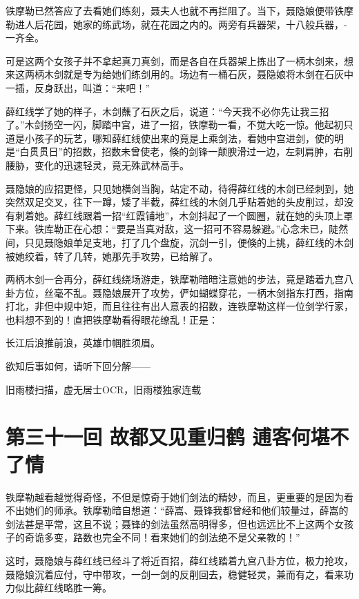 \documentclass[12pt,oneside]{book}
\begin{document}
铁摩勒已然答应了去看她们练刻，聂夫人也就不再拦阻了。当下，聂隐娘便带铁摩勒进人后花园，她家的练武场，就在花园之内的。两旁有兵器架，十八般兵器，-一齐全。

可是这两个女孩子并不拿起真刀真剑，而是各自在兵器架上拣出了一柄木剑来，想来这两柄木剑就是专为给她们练剑用的。场边有一桶石灰，聂隐娘将木剑在石灰中一插，反身跃出，叫道：``来吧！''

薛红线学了她的样子，木剑蘸了石灰之后，说道：``今天我不必你先让我三招了。''木剑扬空一闪，脚踏中宫，进了一招，铁摩勒一看，不觉大吃一惊。他起初只道是小孩子的玩艺，哪知薛红线使出来的竟是上乘剑法，看她中宫进剑，使的明是``白贯贯日''的招数，招数未曾使老，倏的剑锋一颠腴滑过一边，左刺肩肿，右削腰胁，变化的迅速轻灵，竟无殊武林高手。

聂隐娘的应招更怪，只见她横剑当胸，站定不动，待得薛红线的木剑已经刺到，她突然双足交叉，往下一蹲，矮了半截，薛红线的木剑几乎贴着她的头皮削过，却没有刺着她。薛红线跟着一招``红霞铺地''，木剑抖起了一个圆圈，就在她的头顶上罩下来。铁库勒正在心想：``要是当真对敌，这一招可不容易躲避。''心念未已，陡然间，只见聂隐娘单足支地，打了几个盘旋，沉剑一引，便倏的上挑，薛红线的木剑被她绞着，转了几转，她那先手攻势，已给解了。

两柄木剑一合再分，薛红线绕场游走，铁摩勒暗暗注意她的步法，竟是踏着九宫八卦方位，丝毫不乱。聂隐娘展开了攻势，俨如蝴蝶穿花，一柄木剑指东打西，指南打北，非但中规中矩，而且往往有出人意表的招数，连铁摩勒这样一位剑学行家，也料想不到的！直把铁摩勒看得眼花缭乱！正是：

长江后浪推前浪，英雄巾帼胜须眉。

欲知后事如何，请听下回分解------

旧雨楼扫描，虚无居士OCR，旧雨楼独家连载

\chapter{第三十一回 故都又见重归鹤
逋客何堪不了情}\label{ux7b2cux4e09ux5341ux4e00ux56de-ux6545ux90fdux53c8ux89c1ux91cdux5f52ux9e64-ux900bux5ba2ux4f55ux582aux4e0dux4e86ux60c5}

铁摩勒越看越觉得奇怪，不但是惊奇于她们剑法的精妙，而且，更重要的是因为看不出她们的师承。铁摩勒暗自想道：``薛嵩、聂锋我都曾经和他们较量过，薛嵩的剑法甚是平常，这且不说；聂锋的剑法虽然高明得多，但也远远比不上这两个女孩子的奇诡多变，路数也完全不同！看来她们的剑法绝不是父亲教的！''

这时，聂隐娘与薛红线已经斗了将近百招，薛红线踏着九宫八卦方位，极力抢攻，聂隐娘沉着应付，守中带攻，一剑一剑的反削回去，稳健轻灵，兼而有之，看来功力似比薛红线略胜一筹。
\end{document}
